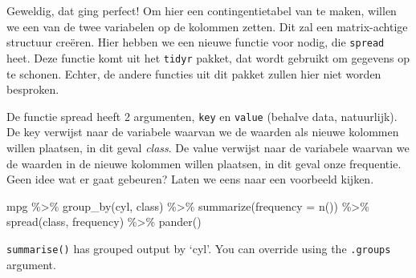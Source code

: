 \documentclass[]{tufte-book}
\newenvironment{Shaded}{}{}
\newcommand{\AttributeTok}[1]{\textcolor[rgb]{0.49,0.56,0.16}{#1}}
\newcommand{\FunctionTok}[1]{\textcolor[rgb]{0.02,0.16,0.49}{#1}}
\newcommand{\NormalTok}[1]{#1}
\newcommand{\SpecialCharTok}[1]{\textcolor[rgb]{0.25,0.44,0.63}{#1}}
\begin{document}
Geweldig, dat ging perfect! Om hier een contingentietabel van te maken, willen we een van de twee variabelen op de kolommen zetten. Dit zal een matrix-achtige structuur creëren. Hier hebben we een nieuwe functie voor nodig, die \texttt{spread} heet. Deze functie komt uit het \texttt{tidyr} pakket, dat wordt gebruikt om gegevens op te schonen. Echter, de andere functies uit dit pakket zullen hier niet worden besproken.

De functie spread heeft 2 argumenten, \texttt{key} en \texttt{value} (behalve data, natuurlijk). De key verwijst naar de variabele waarvan we de waarden als nieuwe kolommen willen plaatsen, in dit geval \emph{class}. De value verwijst naar de variabele waarvan we de waarden in de nieuwe kolommen willen plaatsen, in dit geval onze frequentie. Geen idee wat er gaat gebeuren? Laten we eens naar een voorbeeld kijken.

\begin{Shaded}
\begin{Highlighting}[]
\NormalTok{mpg }\SpecialCharTok{\%\textgreater{}\%}
  \FunctionTok{group\_by}\NormalTok{(cyl, class) }\SpecialCharTok{\%\textgreater{}\%}
  \FunctionTok{summarize}\NormalTok{(}\AttributeTok{frequency =} \FunctionTok{n}\NormalTok{()) }\SpecialCharTok{\%\textgreater{}\%}
  \FunctionTok{spread}\NormalTok{(class, frequency) }\SpecialCharTok{\%\textgreater{}\%}
  \FunctionTok{pander}\NormalTok{()}
\end{Highlighting}
\end{Shaded}

\texttt{summarise()} has grouped output by `cyl'. You can override using the \texttt{.groups} argument.
\end{document}
